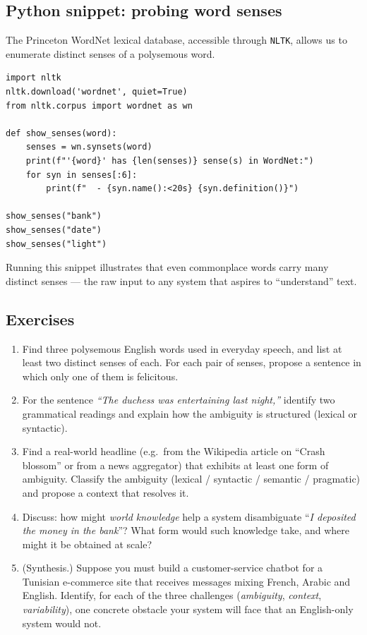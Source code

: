 \documentclass[12pt,a4paper]{report}
\theoremstyle{definition}
\theoremstyle{remark}
\begin{document}
\subsection{Python snippet: probing word senses}

The Princeton WordNet lexical database, accessible through \texttt{NLTK}, allows us to enumerate distinct senses of a polysemous word.

\begin{lstlisting}
import nltk
nltk.download('wordnet', quiet=True)
from nltk.corpus import wordnet as wn

def show_senses(word):
    senses = wn.synsets(word)
    print(f"'{word}' has {len(senses)} sense(s) in WordNet:")
    for syn in senses[:6]:
        print(f"  - {syn.name():<20s} {syn.definition()}")

show_senses("bank")
show_senses("date")
show_senses("light")
\end{lstlisting}

Running this snippet illustrates that even commonplace words carry many distinct senses --- the raw input to any system that aspires to ``understand'' text.

\subsection{Exercises}
\begin{enumerate}
    \item Find three polysemous English words used in everyday speech, and list at least two distinct senses of each. For each pair of senses, propose a sentence in which only one of them is felicitous.
    \item For the sentence \emph{``The duchess was entertaining last night,''} identify two grammatical readings and explain how the ambiguity is structured (lexical or syntactic).
    \item Find a real-world headline (e.g.\ from the Wikipedia article on ``Crash blossom'' or from a news aggregator) that exhibits at least one form of ambiguity. Classify the ambiguity (lexical / syntactic / semantic / pragmatic) and propose a context that resolves it.
    \item Discuss: how might \emph{world knowledge} help a system disambiguate ``\emph{I deposited the money in the bank}''? What form would such knowledge take, and where might it be obtained at scale?
    \item (Synthesis.) Suppose you must build a customer-service chatbot for a Tunisian e-commerce site that receives messages mixing French, Arabic and English. Identify, for each of the three challenges (\emph{ambiguity}, \emph{context}, \emph{variability}), one concrete obstacle your system will face that an English-only system would not.
\end{enumerate}
\end{document}
